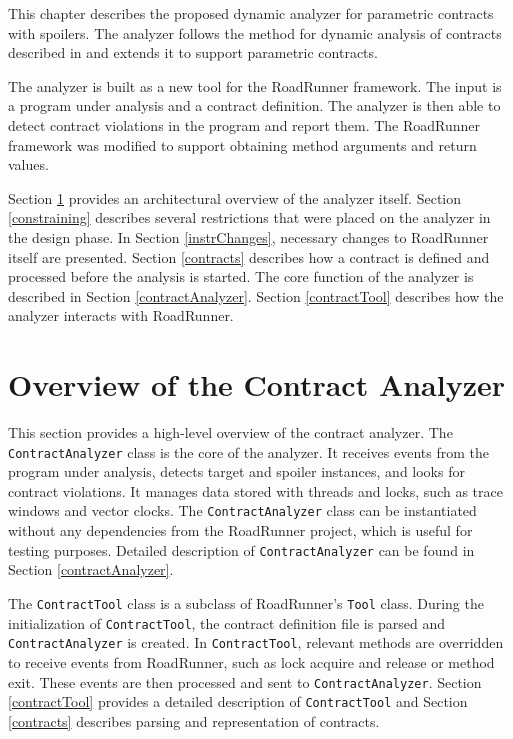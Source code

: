 This chapter describes the proposed dynamic analyzer for parametric contracts
with spoilers. The analyzer follows the method for dynamic analysis of contracts
described in \cite{contracts} and extends it to support parametric contracts.

The analyzer is built as a new tool for the RoadRunner framework. The input is a
program under analysis and a contract definition. The analyzer is then able to
detect contract violations in the program and report them. The RoadRunner
framework was modified to support obtaining method arguments and return values.

Section \ref{overview} provides an architectural overview of the analyzer
itself. Section \ref{constraining} describes several restrictions that were
placed on the analyzer in the design phase. In Section \ref{instrChanges},
necessary changes to RoadRunner itself are presented. Section \ref{contracts}
describes how a contract is defined and processed before the analysis is
started. The core function of the analyzer is described in Section
\ref{contractAnalyzer}. Section \ref{contractTool} describes how the analyzer
interacts with RoadRunner.

\section{Overview of the Contract Analyzer}
\label{overview}

This section provides a high-level overview of the contract analyzer. The
\texttt{ContractAnalyzer} class is the core of the analyzer. It receives events
from the program under analysis, detects target and spoiler instances, and looks
for contract violations. It manages data stored with threads and locks, such as
trace windows and vector clocks. The \texttt{ContractAnalyzer} class can be
instantiated without any dependencies from the RoadRunner project, which is
useful for testing purposes. Detailed description of \texttt{ContractAnalyzer}
can be found in Section \ref{contractAnalyzer}.

The \texttt{ContractTool} class is a subclass of RoadRunner's \texttt{Tool}
class. During the initialization of \texttt{ContractTool}, the contract
definition file is parsed and \texttt{ContractAnalyzer} is created. In
\texttt{ContractTool}, relevant methods are overridden to receive events from
RoadRunner, such as lock acquire and release or method exit. These events are
then processed and sent to \texttt{ContractAnalyzer}. Section \ref{contractTool}
provides a detailed description of \texttt{ContractTool} and Section
\ref{contracts} describes parsing and representation of contracts.

